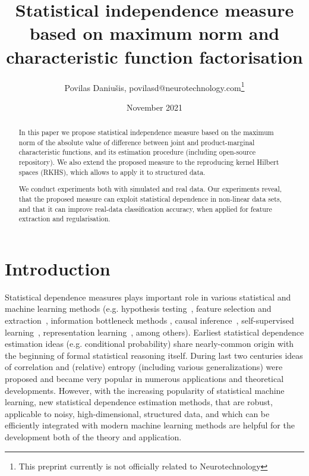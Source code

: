 \documentclass{article}
\title{Statistical independence measure based on maximum norm and characteristic function factorisation}
\author{Povilas Daniu\v{s}is, povilasd@neurotechnology.com\footnote{This preprint currently is not officially related to Neurotechnology}}
\date{November 2021}
\begin{document}
\maketitle

%

\begin{abstract}
    In this paper we propose statistical independence measure based on the maximum norm of the absolute value of difference between joint and product-marginal characteristic functions, and its estimation procedure (including open-source repository). We also extend the proposed measure to the reproducing kernel Hilbert spaces (RKHS), which allows to apply it to structured data.
    
    We conduct experiments both with simulated and real data. Our experiments reveal, that the proposed measure can exploit statistical dependence in non-linear data sets, and that it can improve real-data classification accuracy, when applied for feature extraction and regularisation.
    
\end{abstract}

\section{Introduction}
Statistical dependence measures plays important role in various statistical and machine learning methods (e.g. hypothesis testing~\cite{Gretton2005MeasuringSD}, feature selection and extraction~\cite{EigenHSIC,HSCA}, information bottleneck methods \cite{Ma2020TheHB}, causal inference~\cite{NIPS2008_f7664060}, self-supervised learning~\cite{li2021selfsupervised}, representation learning~\cite{Ragonesi2021LearningUR}, among others).  Earliest statistical dependence estimation ideas (e.g. conditional probability) share nearly-common origin with the beginning of formal statistical reasoning itself. During last two centuries ideas of correlation and (relative) entropy (including various generalizations) were proposed and became very popular in numerous applications and theoretical developments. However, with the increasing popularity of statistical machine learning, new statistical dependence estimation methods, that are robust, applicable to noisy, high-dimensional, structured data, and which can be efficiently integrated with modern machine learning methods are helpful for the development both of the theory and application.
\end{document}
